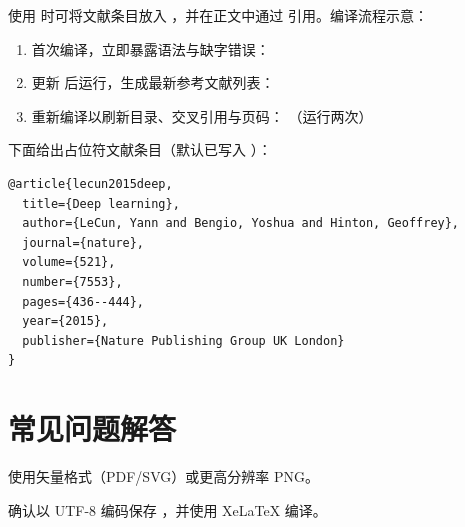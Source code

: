 \documentclass{applemlr}
\begin{document}
使用  时可将文献条目放入 ，并在正文中通过  引用。编译流程示意：
\begin{enumerate}
  \item 首次编译，立即暴露语法与缺字错误：
  \item 更新  后运行，生成最新参考文献列表：
  \item 重新编译以刷新目录、交叉引用与页码： （运行两次）
\end{enumerate}



下面给出占位符文献条目（默认已写入 ）：
\begin{verbatim}
@article{lecun2015deep,
  title={Deep learning},
  author={LeCun, Yann and Bengio, Yoshua and Hinton, Geoffrey},
  journal={nature},
  volume={521},
  number={7553},
  pages={436--444},
  year={2015},
  publisher={Nature Publishing Group UK London}
}
\end{verbatim}

\section{常见问题解答}

\begin{description}[leftmargin=0.5cm,labelindent=0cm]
  \item[图像模糊] 使用矢量格式（PDF/SVG）或更高分辨率 PNG。
  \item[中文乱码] 确认以 UTF-8 编码保存 ，并使用 XeLaTeX 编译。
\end{description}
\end{document}
